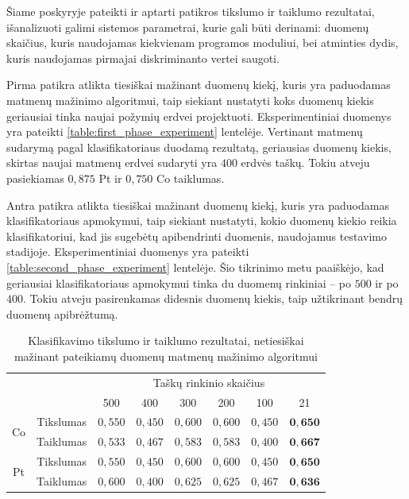 \documentclass[]{vgtuef}
\begin{document}
Šiame poskyryje pateikti ir aptarti patikros tikslumo ir taiklumo rezultatai, išanalizuoti galimi sistemos parametrai, kurie gali būti derinami: duomenų skaičius, kuris naudojamas kiekvienam programos moduliui, bei atminties dydis, kuris naudojamas pirmajai diskriminanto vertei saugoti.

Pirma patikra atlikta tiesiškai mažinant duomenų kiekį, kuris yra paduodamas matmenų mažinimo algoritmui, taip siekiant nustatyti koks duomenų kiekis geriausiai tinka naujai požymių erdvei projektuoti. Eksperimentiniai duomenys yra pateikti \ref{table:first_phase_experiment} lentelėje. Vertinant matmenų sudarymą pagal klasifikatoriaus duodamą rezultatą, geriausias duomenų kiekis, skirtas naujai matmenų erdvei sudaryti yra $400$ erdvės taškų. Tokiu atveju pasiekiamas $0,875$ Pt ir $0,750$ Co taiklumas. 

Antra patikra atlikta tiesiškai mažinant duomenų kiekį, kuris yra paduodamas klasifikatoriaus apmokymui, taip siekiant nustatyti, kokio duomenų kiekio reikia klasifikatoriui, kad jis sugebėtų apibendrinti duomenis, naudojamus testavimo stadijoje. Eksperimentiniai duomenys yra pateikti \ref{table:second_phase_experiment} lentelėje. Šio tikrinimo metu paaiškėjo, kad geriausiai klasifikatoriaus apmokymui tinka du duomenų rinkiniai -- po $500$ ir po $400$. Tokiu atveju pasirenkamas didesnis duomenų kiekis, taip užtikrinant bendrų duomenų apibrėžtumą.

\begin{table}
	\centering
	\renewcommand{\arraystretch}{1.3}
	\caption{Klasifikavimo tikslumo ir taiklumo rezultatai, netiesiškai mažinant pateikiamų duomenų matmenų mažinimo algoritmui}
	\label{table:first_phase_not_linear_experiment}
	\begin{tabular}{|c|c|c|c|c|c|c|c|} \hline
			& & \multicolumn{6}{c|}{Taškų rinkinio skaičius} \\ \cline{3-8}
						&	& 500 	& 400	& 300 	& 200 & 100 	& 21 	\\ \hline
		\multirow{2}{*}{Co}
		& Tikslumas & $0,550$ & $0,450$ & $0,600$ & $0,600$ & $0,450$ & $\mathbf{0,650}$ \\ \cline{2-8}
		& Taiklumas & $0,533$ & $0,467$ & $0,583$ & $0,583$ & $0,400$ & $\mathbf{0,667}$ \\ \hline
		\multirow{2}{*}{Pt}
		& Tikslumas & $0,550$ & $0,450$ & $0,600$ & $0,600$ & $0,450$ & $\mathbf{0,650}$ \\ \cline{2-8}
		& Taiklumas & $0,600$ & $0,400$ & $0,625$ & $0,625$ & $0,467$ & $\mathbf{0,636}$ \\ \hline
	\end{tabular}
\end{table}
\end{document}
